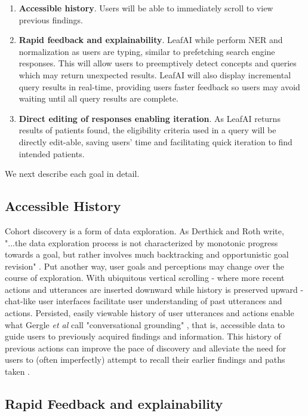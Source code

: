 \documentclass[../main.tex]{subfiles}
\begin{document}
\begin{enumerate}
    \item \textbf{Accessible history}. Users will be able to immediately scroll to view previous findings.
    \item \textbf{Rapid feedback and explainability}. LeafAI while perform NER and normalization as users are typing, similar to prefetching search engine responses. This will allow users to preemptively detect concepts and queries which may return unexpected results. LeafAI will also display incremental query results in real-time, providing users faster feedback so users may avoid waiting until all query results are complete.
    \item \textbf{Direct editing of responses enabling iteration}. As LeafAI returns results of patients found, the eligibility criteria used in a query will be directly edit-able, saving users' time and facilitating quick iteration to find intended patients.
\end{enumerate}

\noindent We next describe each goal in detail.

\subsection{Accessible History} 

Cohort discovery is a form of data exploration. As Derthick and Roth write, "...the data exploration process is not characterized by monotonic progress towards a goal, but rather involves much backtracking and opportunistic goal revision" \cite{derthick2001enhancing}. Put another way, user goals and perceptions may change over the course of exploration. With ubiquitous vertical scrolling - where more recent actions and utterances are inserted downward while history is preserved upward - chat-like user interfaces facilitate user understanding of past utterances and actions. Persisted, easily viewable history of user utterances and actions enable what Gergle \textit{et al} call "conversational grounding" \cite{gergle2004persistence}, that is, accessible data to guide users to previously acquired findings and information. This history of previous actions can improve the pace of discovery and alleviate the need for users to (often imperfectly) attempt to recall their earlier findings and paths taken \cite{hill1994history, gergle2004persistence}.

\subsection{Rapid Feedback and explainability}
\end{document}
